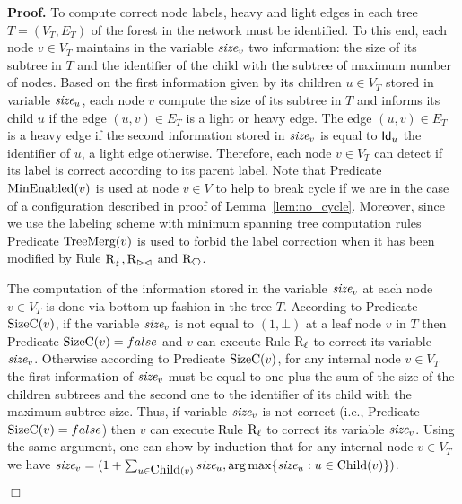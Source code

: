 \documentclass[11pt,a4paper]{article}
\newenvironment{proof}{\noindent \begin{rm}{\textbf{Proof.} }}{\hspace*{\fill}$\Box$\par\end{rm}}
\newcommand{\id}{\mbox{\sf Id}}
\newcommand{\TS}{\mbox{\it size}}
\newcommand{\Child}{\mbox{\rm Child}}
\newcommand{\SizeC}{\mbox{\rm SizeC}}
\newcommand{\TreeChange}{\mbox{\rm TreeMerg}}
\newcommand{\IsMinEnabled}{\mbox{\rm MinEnabled}}
\newcommand{\RC}{\mbox{\rm R$_{\lightning}$}} \newcommand{\RReo}{\mbox{\rm R$_{\downarrow}$}}
\newcommand{\RF}{\mbox{\rm R$_{\vartriangleright \vartriangleleft}$}}
\newcommand{\REnd}{\mbox{\rm R$_{\hexagon}$}}
\begin{document}
\begin{proof}
To compute correct node labels, heavy and light edges in each tree $T=(V_T,E_T)$ of the forest in the network must be identified. To this end, each node $v \in V_T$ maintains in the variable $\TS_v$ two information: the size of its subtree in $T$ and the identifier of the child with the subtree of maximum number of nodes. Based on the first information given by its children $u \in V_T$ stored in variable $\TS_u$, each node $v$ compute the size of its subtree in $T$ and informs its child $u$ if the edge $(u,v) \in E_T$ is a light or heavy edge. The edge $(u,v) \in E_T$ is a heavy edge if the second information stored in $\TS_v$ is equal to $\id_u$ the identifier of $u$, a light edge otherwise. Therefore, each node $v \in V_T$ can detect if its label is correct according to its parent label. Note that Predicate $\IsMinEnabled(v)$ is used at node $v \in V$ to help to break cycle if we are in the case of a configuration described in proof of Lemma~\ref{lem:no_cycle}. Moreover, since we use the labeling scheme with minimum spanning tree computation rules Predicate $\TreeChange(v)$ is used to forbid the label correction when it has been modified by Rule $\RC, \RF$ and $\REnd$.

The computation of the information stored in the variable $\TS_v$ at each node $v \in V_T$ is done via bottom-up fashion in the tree $T$. According to Predicate $\SizeC(v)$, if the variable $\TS_v$ is not equal to $(1,\bot)$ at a leaf node $v$ in $T$ then Predicate $\SizeC(v)=false$ and $v$ can execute Rule $\mbox{\rm R$_{\ell}$}$ to correct its variable $\TS_v$. Otherwise according to Predicate $\SizeC(v)$, for any internal node $v \in V_T$ the first information of $\TS_v$ must be equal to one plus the sum of the size of the children subtrees and the second one to the identifier of its child with the maximum subtree size. Thus, if variable $\TS_v$ is not correct (i.e., Predicate $\SizeC(v)=false$) then $v$ can execute Rule $\mbox{\rm R$_{\ell}$}$ to correct its variable $\TS_v$. Using the same argument, one can show by induction that for any internal node $v \in V_T$ we have $\TS_v=(1+\sum_{u \in \Child(v)} \TS_u,\arg\max\{\TS_u: u\in \Child(v)\})$.


\end{proof}
\end{document}
